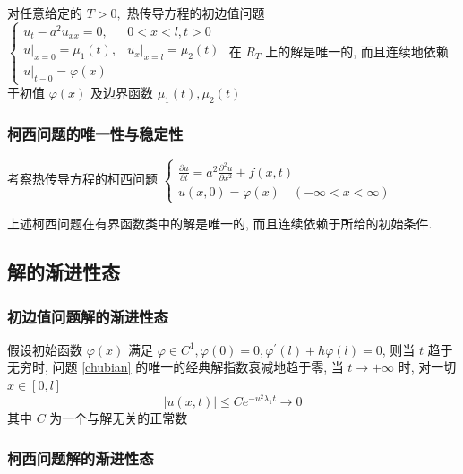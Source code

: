 \documentclass[10pt]{yerbaformat}
\begin{document}
\begin{theorem}
    对任意给定的 $T>0,$ 热传导方程的初边值问题 $\left\{\begin{array}{ll}u_{t}-a^{2} u_{x x}=0, & 0<x<l, t>0 \\ \left.u\right|_{x=0}=\mu_{1}(t), & \left.u_{x}\right|_{x=l}=\mu_{2}(t) \\ u|_{t-0}=\varphi(x)\end{array}\right.$ 在 $R_{T}$ 上的解是唯一的, 而且连续地依赖于初值 $\varphi(x)$ 及边界函数 $\mu_{1}(t), \mu_{2}(t)$
\end{theorem}

\subsubsection{柯西问题的唯一性与稳定性}

\par 考察热传导方程的柯西问题 $\left\{\begin{array}{l}\frac{\partial u}{\partial t}=a^{2} \frac{\partial^{2} u}{\partial x^{2}}+f(x, t) \\ u(x, 0)=\varphi(x) \quad(-\infty<x<\infty)\end{array}\right.$

\begin{theorem}
    上述柯西问题在有界函数类中的解是唯一的, 而且连续依赖于所给的初始条件.
\end{theorem}

\subsection{解的渐进性态}
\subsubsection*{初边值问题解的渐进性态}

\begin{theorem}
    假设初始函数 $\varphi(x)$ 满足 $\varphi \in C^{1}, \varphi(0)=0, \varphi^{\prime}(l)+h \varphi(l)=0$, 则当 $t$ 趋于无穷时, 问题 \ref{chubian} 的唯一的经典解指数衰减地趋于零, 当 $t \rightarrow+\infty$ 时, 对一切 $x \in[0, l]$ $$ |u(x, t)| \leqslant C e^{-u^{2} \lambda_{1} t} \rightarrow 0 $$ 其中 $C$ 为一个与解无关的正常数
\end{theorem}

\subsubsection*{柯西问题解的渐进性态}
\end{document}
